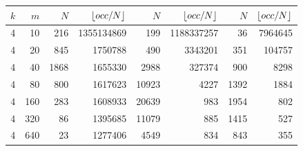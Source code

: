 \begin{table}[p]
\begin{minipage}[c]{0.49\textwidth}
\begin{tabular}{|rr|rr|rr|rr|}
$k$ & $m$
& $N$ & $\lfloor occ/N \rfloor$
& $N$ & $\lfloor occ/N \rfloor$
& $N$ & $\lfloor occ/N \rfloor$ \\
\hline
\num{4} &   \num{10} &  \num{216} & \num{1355134869} &   \num{199} & \num{1188337257} &   \num{36} & \num{7964645} \\
\num{4} &   \num{20} &  \num{845} &    \num{1750788} &   \num{490} &    \num{3343201} &  \num{351} &  \num{104757} \\
\num{4} &   \num{40} & \num{1868} &    \num{1655330} &  \num{2988} &     \num{327374} &  \num{900} &    \num{8298} \\
\num{4} &   \num{80} &  \num{800} &    \num{1617623} & \num{10923} &       \num{4227} & \num{1392} &    \num{1884} \\
\num{4} &  \num{160} &  \num{283} &    \num{1608933} & \num{20639} &        \num{983} & \num{1954} &     \num{802} \\
\num{4} &  \num{320} &   \num{86} &    \num{1395685} & \num{11079} &        \num{885} & \num{1415} &     \num{527} \\
\num{4} &  \num{640} &   \num{23} &    \num{1277406} &  \num{4549} &        \num{834} &  \num{843} &     \num{355} \\

\end{tabular}
\end{minipage}
\end{table}
